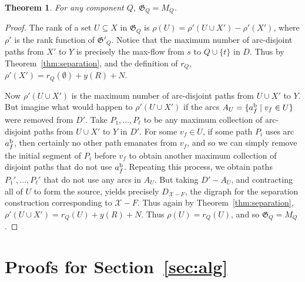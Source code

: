 \documentclass[11pt, letterpaper]{article}
\newtheorem{theorem}{Theorem}[section]
\theoremstyle{definition}
\newcommand{\grphx}{\mathcal{X}}
\newcommand{\remove}{-}
\newcommand{\gammoid}{\mathfrak{G}}
\newcommand{\bgammoid}{\gammoid'}
\newcommand{\brank}{\rho'}
\newcommand{\rank}{\rho}
\newcommand{\aback}{a^{\text{\rm b}}}
\begin{document}
\begin{theorem}\label{thm:gammoid}
	For any component $Q$, $\gammoid_Q = M_Q$.
\end{theorem}
\begin{proof}


The rank of a set $U \subseteq X$ in $\gammoid_Q$ is $\rank(U) = \brank(U \cup X') - \brank(X')$, where $\brank$ is the rank function of $\bgammoid_Q$.
Notice that the maximum number of arc-disjoint paths from $X'$ to $Y$ is precisely the max-flow from $s$ to $Q \cup \{t\}$ in $D$.
Thus by Theorem~\ref{thm:separation}, and the definition of $r_Q$, $\brank(X') = r_Q(\emptyset) + y(R) + N$.

Now $\brank(U \cup X')$ is the maximum number of arc-disjoint paths from $U \cup X'$ to $Y$.
But imagine what would happen to $\brank(U \cup X')$ if the arcs $A_U = \{ \aback_f \mid v_f \in U\}$ were removed from $D'$.
Take $P_1, \ldots, P_{\ell}$ to be any maximum collection of arc-disjoint paths from $U \cup X'$ to $Y$ in $D'$.
For some $v_f \in U$,  if some path $P_i$ uses arc $\aback_f$, then certainly no other path emanates from $v_f$, and so we can simply remove the initial segment of $P_i$ before $v_f$ to obtain another maximum collection of disjoint paths that do not use $\aback_f$. 
Repeating this process, we obtain paths $P_1', \ldots, P_{\ell}'$ that do not use any arcs in $A_U$.
But taking $D' - A_U$, and contracting all of $U$ to form the source, yields precisely $D_{\grphx \remove F}$, the digraph for the separation construction corresponding to $\grphx \remove F$.
Thus again by Theorem~\ref{thm:separation}, $\brank(U \cup X') = r_Q(U) + y(R) + N$.
Thus $\rank(U) = r_Q(U)$, and so $\gammoid_Q = M_Q$.
\end{proof}



\section{Proofs for Section~\ref{sec:alg}}\label{appendix:alg}
\end{document}
